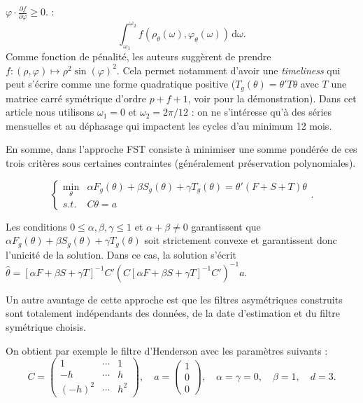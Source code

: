 \documentclass[
  11pt,
  french,
  a4paper]{article}
\newcommand\1{\mathds{1}}
\newcommand\ud{\,\mathrm{d}}
\begin{document}
\begin{itemize}
{    \(\varphi \cdot \frac{\partial f}{\partial \varphi} \geq 0\).} :
  \[
  \int_{\omega_{1}}^{\omega_{2}}f(\rho_{\theta}(\omega),\varphi_{\theta}(\omega))\ud\omega.
  \]
  Comme fonction de pénalité, les auteurs suggèrent de prendre \(f\colon(\rho,\varphi)\mapsto\rho^2\sin(\varphi)^2\).
  Cela permet notamment d'avoir une \emph{timeliness} qui peut s'écrire comme une forme quadratique positive (\(T_g(\theta)=\theta'T\theta\) avec \(T\) une matrice carré symétrique d'ordre \(p+f+1\), voir \textcite{ch15HBSA} pour la démonstration).
  Dans cet article nous utilisons \(\omega_1=0\) et \(\omega_2=2\pi/12\) : on ne s'intéresse qu'à des séries mensuelles et au déphasage qui impactent les cycles d'au minimum 12 mois.
\end{itemize}

En somme, dans l'approche FST consiste à minimiser une somme pondérée de ces trois critères sous certaines contraintes (généralement préservation polynomiales).

\begin{equation}
\begin{cases}
\underset{\theta}{\min} &
\alpha F_g(\theta)+\beta S_g(\theta)+\gamma T_g(\theta) = \theta'(F+S+T)\theta\\
s.t. & C\theta=a
\end{cases}. \label{eq:gugemmos}
\end{equation}

Les conditions \(0\leq\alpha,\beta,\gamma\leq 1\) et \(\alpha+\beta\ne0\) garantissent que \(\alpha F_g(\theta)+\beta S_g(\theta)+\gamma T_g(\theta)\) soit strictement convexe et garantissent donc l'unicité de la solution.
Dans ce cas, la solution s'écrit \(\hat \theta = [\alpha F+\beta S+ \gamma T]^{-1}C'\left(C[\alpha F+\beta S+ \gamma T]^{-1}C'\right)^{-1}a\).

Un autre avantage de cette approche est que les filtres asymétriques construits sont totalement indépendants des données, de la date d'estimation et du filtre symétrique choisis.

On obtient par exemple le filtre d'Henderson avec les paramètres suivants :
\[C=\begin{pmatrix}
1 & \cdots&1\\
-h & \cdots&h \\
(-h)^2 & \cdots&h^2
\end{pmatrix},\quad
a=\begin{pmatrix}
1 \\0\\0
\end{pmatrix},\quad
\alpha=\gamma=0,\quad
\beta=1,\quad d=3.\]
\end{document}
